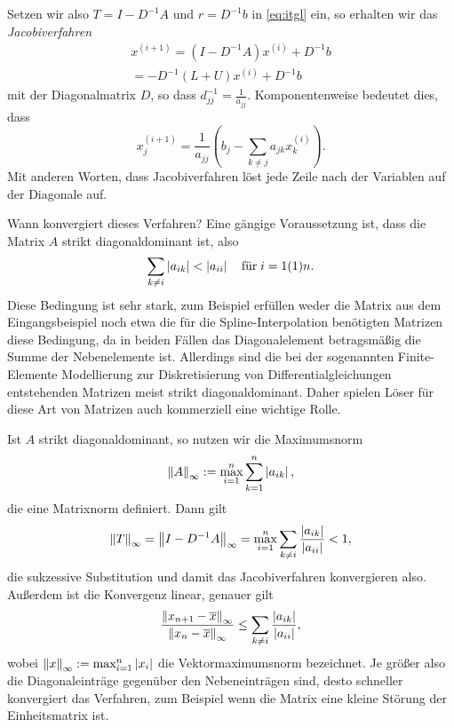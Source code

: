Setzen wir also $T=I-D^{-1}A$ und $r=D^{-1}b$ in \eqref{eq:itgl} ein,
so erhalten wir das \emph{Jacobiverfahren}
\begin{align}
  x^{(i+1)} = \left(I - D^{-1}A\right)x^{(i)} + D^{-1}b\nonumber\\
  = -D^{-1}\left(L + U\right)x^{(i)} + D^{-1}b
\end{align}
mit der Diagonalmatrix $D$, so dass $d^{-1}_{jj} =
\frac{1}{a_{jj}}$. Komponentenweise bedeutet dies, dass
\begin{equation}
  \label{eq:jacobicomp}
  x_j^{(i+1)} = \frac{1}{a_{jj}}\left(b_j - \sum_{k\neq j} a_{jk}x_k^{(i)}\right).
\end{equation}
Mit anderen Worten, dass Jacobiverfahren löst jede Zeile nach der
Variablen auf der Diagonale auf.

Wann konvergiert dieses Verfahren? Eine gängige Voraussetzung ist,
dass die Matrix $A$ strikt diagonaldominant ist, also
\begin{equation}
  \sum_{k\neq i} \left\lvert{a_{ik}}\right\rvert < \left\lvert{a_{ii}}\right\rvert\quad\text{für}\; i=1(1)n.
\end{equation}
Diese Bedingung ist sehr stark, zum Beispiel erfüllen weder die Matrix
aus dem Eingangsbeispiel noch etwa die für die Spline-Interpolation
benötigten Matrizen diese Bedingung, da in beiden Fällen das
Diagonalelement betragsmäßig die Summe der Nebenelemente
ist. Allerdings sind die bei der sogenannten Finite-Elemente
Modellierung zur Diskretisierung von Differentialgleichungen
entstehenden Matrizen meist strikt diagonaldominant. Daher spielen
Löser für diese Art von Matrizen auch kommerziell eine wichtige Rolle.

Ist $A$ strikt diagonaldominant, so nutzen wir die Maximumsnorm
\begin{equation}
  \left\lVert{A}\right\rVert_\infty := \max_{i=1}^n \sum_{k=1}^n \left\lvert{a_{ik}}\right\rvert,
\end{equation}
die eine Matrixnorm definiert. Dann gilt
\begin{equation}
  \left\lVert{T}\right\rVert_{\infty} = \left\lVert{I-D^{-1}A}\right\rVert_{\infty} =
  \max_{i=1}^n \sum_{k\neq i} \frac{\left\lvert{a_{ik}}\right\rvert}{\left\lvert{a_{ii}}\right\rvert} < 1,
\end{equation}
die sukzessive Substitution und damit das Jacobiverfahren konvergieren
also. Außerdem ist die Konvergenz linear, genauer gilt
\begin{equation}
  \frac{\left\lVert{x_{n+1} - \overline{x}}\right\rVert_\infty}{\left\lVert{x_{n} - \overline{x}}\right\rVert_\infty}
  \le \sum_{k\neq i} \frac{\left\lvert{a_{ik}}\right\rvert}{\left\lvert{a_{ii}}\right\rvert},
\end{equation}
wobei $\left\lVert{x}\right\rVert_\infty := \max_{i=1}^n \left\lvert{x_i}\right\rvert$ die
Vektormaximumsnorm bezeichnet. Je größer also die Diagonaleinträge
gegenüber den Nebeneinträgen sind, desto schneller konvergiert das
Verfahren, zum Beispiel wenn die Matrix eine kleine Störung der
Einheitsmatrix ist.

